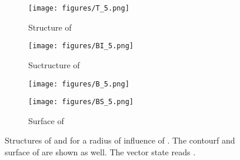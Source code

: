 \documentclass[12pt]{article}
\begin{document}
\begin{figure}[htp]
\centering
\begin{subfigure}{0.45\textwidth}
\centering
\texttt{[image: figures/T\_5.png]}
\caption{Structure of }
\label{fig:structure-of-T}
\end{subfigure}\begin{subfigure}{0.45\textwidth}
\centering
\texttt{[image: figures/BI\_5.png]}
\caption{Suctructure of }
\label{fig:structure-of-B-inv}
\end{subfigure}

\begin{subfigure}{0.45\textwidth}
\centering
\texttt{[image: figures/B\_5.png]}
\caption{}
\label{fig:BEST}
\end{subfigure}\begin{subfigure}{0.45\textwidth}
\centering
\texttt{[image: figures/BS\_5.png]}
\caption{Surface of }
\label{fig:BEST-waves}
\end{subfigure}
\caption{Structures of  and  for a radius of influence of . The contourf and surface of  are shown as well. The vector state reads .}
\label{fig:local-structure}
\end{figure}
\end{document}
